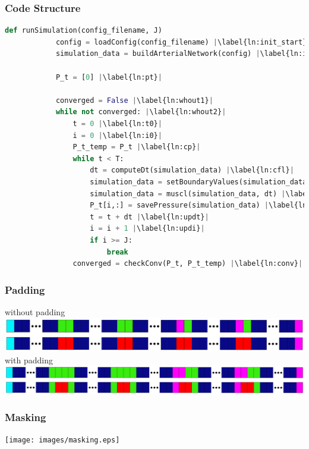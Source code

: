 \documentclass{beamer}
\begin{document}
\begin{frame} [fragile]
	\frametitle{Code Structure}
	\begin{lstlisting}[basicstyle=\fontsize{8}{8}\selectfont\ttfamily, language=Python, caption=The code structure of an entire simulation is given here in pseudocode. Each line is detailed throughout this section., label=lst:pc, escapechar=|] 
		def runSimulation(config_filename, J) 
			config = loadConfig(config_filename) |\label{ln:init_start}|
			simulation_data = buildArterialNetwork(config) |\label{ln:init_end}|

			P_t = [0] |\label{ln:pt}|

			converged = False |\label{ln:whout1}|
			while not converged: |\label{ln:whout2}|
				t = 0 |\label{ln:t0}|
				i = 0 |\label{ln:i0}|
				P_t_temp = P_t |\label{ln:cp}|
				while t < T:
					dt = computeDt(simulation_data) |\label{ln:cfl}|
					simulation_data = setBoundaryValues(simulation_data, dt) |\label{ln:bv    }|
					simulation_data = muscl(simulation_data, dt) |\label{ln:muscl}|
					P_t[i,:] = savePressure(simulation_data) |\label{ln:svp}|
					t = t + dt |\label{ln:updt}|
					i = i + 1 |\label{ln:updi}|
					if i >= J:
						break
				converged = checkConv(P_t, P_t_temp) |\label{ln:conv}|
\end{lstlisting}
\end{frame}
\begin{frame}
	\frametitle{Padding}
	without padding
	\includegraphics[width=\textwidth]{images/padding1.eps}
	with padding
	\includegraphics[width=\textwidth]{images/padding2.eps}
\end{frame}
\begin{frame}
	\frametitle{Masking}
	\texttt{[image: images/masking.eps]}
\end{frame}
\end{document}
